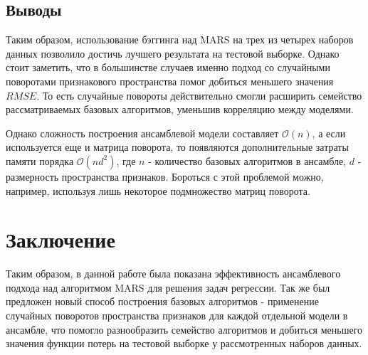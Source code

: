 \documentclass{article}
\begin{document}
\subsection{Выводы}

Таким образом, использование бэггинга над MARS на трех из четырех наборов данных позволило достичь лучшего результата на тестовой выборке. Однако стоит заметить, что в большинстве случаев именно подход со случайными поворотами признакового пространства помог добиться меньшего значения $RMSE$. То есть случайные повороты действительно смогли расширить семейство рассматриваемых базовых алгоритмов, уменьшив корреляцию между моделями.

Однако сложность построения ансамблевой модели составляет $\mathcal{O}(n)$, а если используется еще и матрица поворота, то появляются дополнительные затраты памяти порядка $\mathcal{O}(nd^2)$, где $n$ - количество базовых алгоритмов в ансамбле, $d$ - размерность пространства признаков. Бороться с этой проблемой можно, например, используя лишь некоторое подмножество матриц поворота.


\section{Заключение}
Таким образом, в данной работе была показана эффективность ансамблевого подхода над алгоритмом MARS для решения задач регрессии. Так же был предложен новый способ построения базовых алгоритмов - применение случайных поворотов пространства признаков для каждой отдельной модели в ансамбле, что помогло разнообразить семейство алгоритмов и добиться меньшего значения функции потерь на тестовой выборке у рассмотренных наборов данных.



\end{document}
